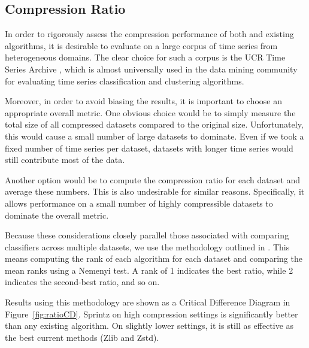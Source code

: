 

\subsection{Compression Ratio}

In order to rigorously assess the compression performance of both \minesp and existing algorithms, it is desirable to evaluate on a large corpus of time series from heterogeneous domains. The clear choice for such a corpus is the UCR Time Series Archive \cite{ucrTimeSeries}, which is almost universally used in the data mining community for evaluating time series classification and clustering algorithms.

Moreover, in order to avoid biasing the results, it is important to choose an appropriate overall metric. One obvious choice would be to simply measure the total size of all compressed datasets compared to the original size. Unfortunately, this would cause a small number of large datasets to dominate. Even if we took a fixed number of time series per dataset, datasets with longer time series would still contribute most of the data.

Another option would be to compute the compression ratio for each dataset and average these numbers. This is also undesirable for similar reasons. Specifically, it allows performance on a small number of highly compressible datasets to dominate the overall metric.

Because these considerations closely parallel those associated with comparing classifiers across multiple datasets, we use the methodology outlined in \cite{cdDiagrams}. This means computing the rank of each algorithm for each dataset and comparing the mean ranks using a Nemenyi test. A rank of 1 indicates the best ratio, while 2 indicates the second-best ratio, and so on.

Results using this methodology are shown as a Critical Difference Diagram \cite{cdDiagrams} in Figure~\ref{fig:ratioCD}. Sprintz on high compression settings is significantly better than any existing algorithm. On slightly lower settings, it is still as effective as the best current methods (Zlib and Zstd).

